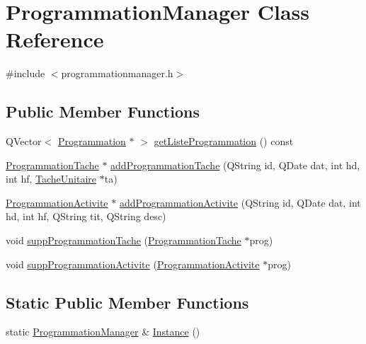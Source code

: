 \hypertarget{class_programmation_manager}{}\section{Programmation\+Manager Class Reference}
\label{class_programmation_manager}


{\ttfamily \#include $<$programmationmanager.\+h$>$}

\subsection*{Public Member Functions}
\begin{DoxyCompactItemize}
\item 
Q\+Vector$<$ \hyperlink{class_programmation}{Programmation} $\ast$ $>$ \hyperlink{class_programmation_manager_a05398cf87cb227b0e2e9fbf93b36af80}{get\+Liste\+Programmation} () const 
\item 
\hyperlink{class_programmation_tache}{Programmation\+Tache} $\ast$ \hyperlink{class_programmation_manager_a286ba93621f944ed4e3d52a6c32b9f46}{add\+Programmation\+Tache} (Q\+String id, Q\+Date dat, int hd, int hf, \hyperlink{class_tache_unitaire}{Tache\+Unitaire} $\ast$ta)
\item 
\hyperlink{class_programmation_activite}{Programmation\+Activite} $\ast$ \hyperlink{class_programmation_manager_afcead9271094c4b839a750527406c366}{add\+Programmation\+Activite} (Q\+String id, Q\+Date dat, int hd, int hf, Q\+String tit, Q\+String desc)
\item 
void \hyperlink{class_programmation_manager_af3c39775fa3ea5a8642181dbed0a519c}{supp\+Programmation\+Tache} (\hyperlink{class_programmation_tache}{Programmation\+Tache} $\ast$prog)
\item 
void \hyperlink{class_programmation_manager_a2781cb1d7ae670b5b779cbe76f7714a6}{supp\+Programmation\+Activite} (\hyperlink{class_programmation_activite}{Programmation\+Activite} $\ast$prog)
\end{DoxyCompactItemize}
\subsection*{Static Public Member Functions}
\begin{DoxyCompactItemize}
\item 
static \hyperlink{class_programmation_manager}{Programmation\+Manager} \& \hyperlink{class_programmation_manager_a8b2d81872d9d34cc33e0a0b348875550}{Instance} ()
\end{DoxyCompactItemize}
